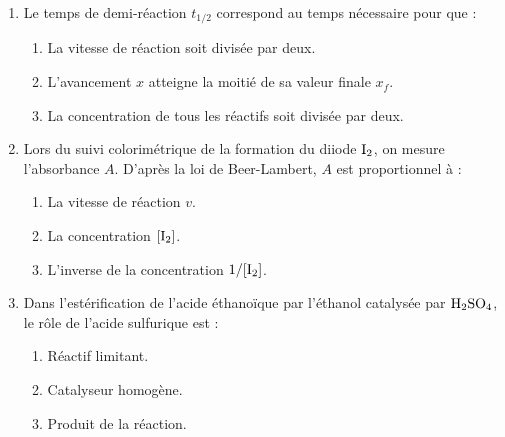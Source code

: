 \documentclass[11pt]{article}
\begin{document}
\begin{exercice}
\begin{enumerate}
    \item Le temps de demi-réaction $t_{1/2}$ correspond au temps nécessaire pour que :
    \begin{enumerate}
        \item La vitesse de réaction soit divisée par deux.
        \item L'avancement $x$ atteigne la moitié de sa valeur finale $x_f$.
        \item La concentration de tous les réactifs soit divisée par deux.
    \end{enumerate}
    \item Lors du suivi colorimétrique de la formation du diiode $\ce{I2}$, on mesure l'absorbance $A$. D'après la loi de Beer-Lambert, $A$ est proportionnel à :
    \begin{enumerate}
        \item La vitesse de réaction $v$.
        \item La concentration $[\ce{I2}]$.
        \item L'inverse de la concentration $1/[\ce{I2}]$.
    \end{enumerate}
    \item Dans l'estérification de l'acide éthanoïque par l'éthanol catalysée par $\ce{H2SO4}$, le rôle de l'acide sulfurique est :
    \begin{enumerate}
        \item Réactif limitant.
        \item Catalyseur homogène.
        \item Produit de la réaction.
    \end{enumerate}
\end{enumerate}
\end{exercice}
\end{document}
